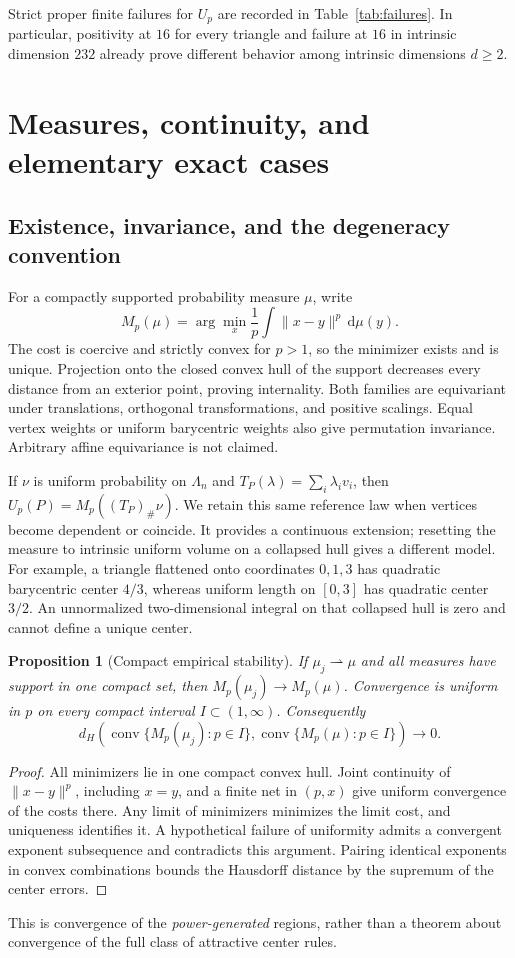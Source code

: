 \documentclass[11pt]{article}
\newtheorem{proposition}[theorem]{Proposition}
\theoremstyle{definition}
\newcommand{\conv}{\operatorname{conv}}
\newcommand{\dd}{\,\mathrm d}
\begin{document}
Strict proper finite failures for $U_p$ are recorded in
Table~\ref{tab:failures}. In particular, positivity at $16$ for every
triangle and failure at $16$ in intrinsic dimension $232$ already prove
different behavior among intrinsic dimensions $d\ge2$.

\section{Measures, continuity, and elementary exact cases}
\subsection{Existence, invariance, and the degeneracy convention}
For a compactly supported probability measure $\mu$, write
\[
 M_p(\mu)=\arg\min_x\frac1p\int\|x-y\|^p\dd\mu(y).
\]
The cost is coercive and strictly convex for $p>1$, so the minimizer exists
and is unique. Projection onto the closed convex hull of the support
decreases every distance from an exterior point, proving internality.
Both families are equivariant under translations, orthogonal transformations,
and positive scalings. Equal vertex weights or uniform barycentric weights
also give permutation invariance. Arbitrary affine equivariance is not
claimed.

If $\nu$ is uniform probability on $\Lambda_n$ and
$T_P(\lambda)=\sum_i\lambda_i v_i$, then
$U_p(P)=M_p((T_P)_\#\nu)$. We retain this same reference law when vertices
become dependent or coincide. It provides a continuous extension; resetting
the measure to intrinsic uniform volume on a collapsed hull gives a
different model. For example, a triangle flattened onto coordinates $0,1,3$
has quadratic barycentric center $4/3$, whereas uniform length on $[0,3]$
has quadratic center $3/2$. An unnormalized two-dimensional integral on
that collapsed hull is zero and cannot define a unique center.

\begin{proposition}[Compact empirical stability]\label{prop:stability}
If $\mu_j\rightharpoonup\mu$ and all measures have support in one compact
set, then $M_p(\mu_j)\to M_p(\mu)$. Convergence is uniform in $p$ on every
compact interval $I\subset(1,\infty)$. Consequently
\[
 d_H\!\left(\conv\{M_p(\mu_j):p\in I\},
             \conv\{M_p(\mu):p\in I\}\right)\longrightarrow0.
\]
\end{proposition}
\begin{proof}
All minimizers lie in one compact convex hull. Joint continuity of
$\|x-y\|^p$, including $x=y$, and a finite net in $(p,x)$ give uniform
convergence of the costs there. Any limit of minimizers minimizes the
limit cost, and uniqueness identifies it. A hypothetical failure of
uniformity admits a convergent exponent subsequence and contradicts this
argument. Pairing identical exponents in convex combinations bounds the
Hausdorff distance by the supremum of the center errors.
\end{proof}
This is convergence of the \emph{power-generated} regions, rather than a
theorem about convergence of the full class of attractive center rules.
\end{document}
